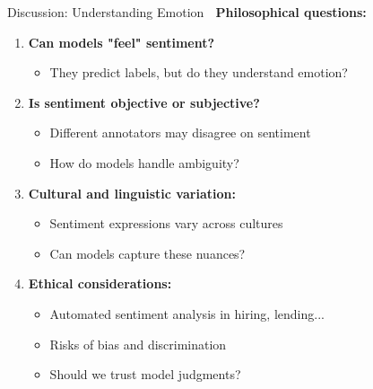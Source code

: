 \documentclass[aspectratio=169]{beamer}
\begin{document}
\begin{frame}[shrink=10]{Discussion: Understanding Emotion 💭}
    \textbf{Philosophical questions:}

    \begin{enumerate}\setlength{\itemsep}{0pt}
        \item \textbf{Can models "feel" sentiment?}
        \begin{itemize}\setlength{\itemsep}{0pt}
            \item They predict labels, but do they understand emotion?
        \end{itemize}

        \item \textbf{Is sentiment objective or subjective?}
        \begin{itemize}\setlength{\itemsep}{0pt}
            \item Different annotators may disagree on sentiment
            \item How do models handle ambiguity?
        \end{itemize}

        \item \textbf{Cultural and linguistic variation:}
        \begin{itemize}\setlength{\itemsep}{0pt}
            \item Sentiment expressions vary across cultures
            \item Can models capture these nuances?
        \end{itemize}

        \item \textbf{Ethical considerations:}
        \begin{itemize}\setlength{\itemsep}{0pt}
            \item Automated sentiment analysis in hiring, lending...
            \item Risks of bias and discrimination
            \item Should we trust model judgments?
        \end{itemize}
    \end{enumerate}
\end{frame}
\end{document}

